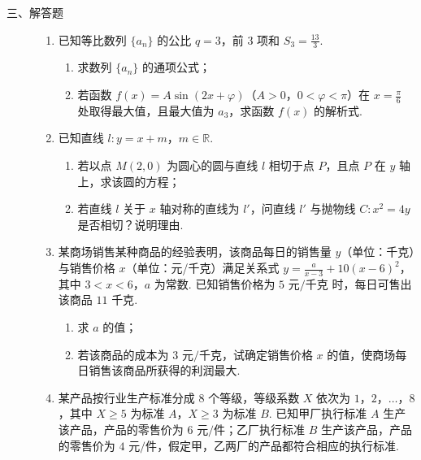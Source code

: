 \begin{description}

    \item[三、解答题]

    \begin{enumerate}[leftmargin=5pt]

      \addtocounter{enumi}{+15}

        \item 已知等比数列 \(\{a_n\}\) 的公比 \(q=3\)，前 \(3\) 项和 \(S_3=\frac{13}{3}\).

\begin{enumerate}
\item 求数列 \(\{a_n\}\) 的通项公式；
\item 若函数 \(f(x)=A\sin\left(2x+\varphi\right)\)（\(A>0\)，\(0<\varphi<\pi\)）在 \(x=\frac{\pi}{6}\) 处取得最大值，且最大值为 \(a_3\)，求函数 \(f(x)\) 的解析式.
\end{enumerate}

        \item 已知直线 \(l:y=x+m\)，\(m\in\mathbb{R}\).

\begin{enumerate}
\item 若以点 \(M(2,0)\) 为圆心的圆与直线 \(l\) 相切于点 \(P\)，且点 \(P\) 在 \(y\) 轴上，求该圆的方程；
\item 若直线 \(l\) 关于 \(x\) 轴对称的直线为 \(l'\)，问直线 \(l'\) 与抛物线 \(C:x^2=4y\) 是否相切？说明理由.
\end{enumerate}

        \item 某商场销售某种商品的经验表明，该商品每日的销售量 \(y\)（单位：千克）与销售价格 \(x\)（单位：元/千克）满足关系式 \(y=\frac{a}{x-3}+10(x-6)^2\)，其中 \(3<x<6\)，\(a\) 为常数. 已知销售价格为 \(5\text{ 元/千克}\) 时，每日可售出该商品 \(11\text{ 千克}\).

\begin{enumerate}
\item 求 \(a\) 的值；
\item 若该商品的成本为 \(3\text{ 元/千克}\)，试确定销售价格 \(x\) 的值，使商场每日销售该商品所获得的利润最大.
\end{enumerate}

        \item 某产品按行业生产标准分成 \(8\) 个等级，等级系数 \(X\) 依次为 \(1\)，\(2\)，\(\dots\)，\(8\)，其中 \(X\geqslant 5\) 为标准 \(A\)，\(X\geqslant 3\) 为标准 \(B\). 已知甲厂执行标准 \(A\) 生产该产品，产品的零售价为 \(6\text{ 元/件}\)；乙厂执行标准 \(B\) 生产该产品，产品的零售价为 \(4\text{ 元/件}\)，假定甲，乙两厂的产品都符合相应的执行标准.


\end{enumerate}
\end{description}

